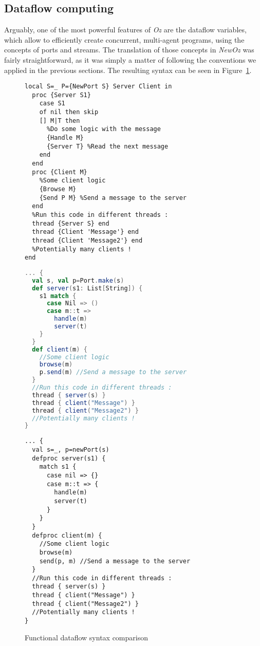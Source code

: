 \subsection{Dataflow computing}
Arguably, one of the most powerful features of \textit{Oz} are the dataflow variables, which allow to efficiently create concurrent, multi-agent programs, using the concepts of ports and streams.
The translation of those concepts in \textit{NewOz} was fairly straightforward, as it was simply a matter of following the conventions we applied in the previous sections.
The resulting syntax can be seen in Figure~\ref{fig:code-comp-dataflow}.
\begin{figure}
    \noindent\begin{minipage}{.49\textwidth}
\begin{lstlisting}[title={Oz},language=oz]
local S=_ P={NewPort S} Server Client in
  proc {Server S1}
    case S1
    of nil then skip
    [] M|T then
      %Do some logic with the message
      {Handle M}
      {Server T} %Read the next message
    end
  end
  proc {Client M}
    %Some client logic
    {Browse M}
    {Send P M} %Send a message to the server
  end
  %Run this code in different threads :
  thread {Server S} end
  thread {Client 'Message'} end
  thread {Client 'Message2'} end
  %Potentially many clients !
end
\end{lstlisting}
    \end{minipage}
    \hfill
    \noindent\begin{minipage}{.49\textwidth}
\begin{lstlisting}[title={Ozma},language=scala]
... {
  val s, val p=Port.make(s)
  def server(s1: List[String]) {
    s1 match {
      case Nil => ()
      case m::t =>
        handle(m)
        server(t)
    }
  }
  def client(m) {
    //Some client logic
    browse(m)
    p.send(m) //Send a message to the server
  }
  //Run this code in different threads :
  thread { server(s) }
  thread { client("Message") }
  thread { client("Message2") }
  //Potentially many clients !
}
\end{lstlisting}
    \end{minipage}
    \begin{center}
        \noindent\begin{minipage}{.89\textwidth}
\begin{lstlisting}[title={NewOz 2020/2021},language=newoz]
... {
  val s=_, p=newPort(s)
  defproc server(s1) {
    match s1 {
      case nil => {}
      case m::t => {
        handle(m)
        server(t)
      }
    }
  }
  defproc client(m) {
    //Some client logic
    browse(m)
    send(p, m) //Send a message to the server
  }
  //Run this code in different threads :
  thread { server(s) }
  thread { client("Message") }
  thread { client("Message2") }
  //Potentially many clients !
}
\end{lstlisting}
        \end{minipage}
    \end{center}
    \caption{Functional dataflow syntax comparison}
    \label{fig:code-comp-dataflow}
\end{figure}

